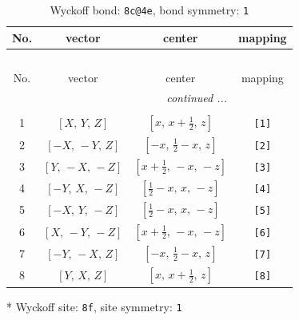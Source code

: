 \documentclass[fleqn,8pt]{jsarticle}
\begin{document}
\renewcommand{\arraystretch}{1.2}
\begin{longtable}{cccc}
\caption{Wyckoff bond: {\tt 8c@4e}, bond symmetry: {\tt 1}}
 \\
 \hline \hline
No. & vector & center & mapping \\ \hline \endfirsthead

\multicolumn{3}{l}{\tablename\ \thetable{}} \\
 \hline \hline
No. & vector & center & mapping \\ \hline \endhead

 \hline \hline
\multicolumn{3}{r}{\footnotesize\it continued ...} \\ \endfoot

 \hline \hline
\multicolumn{3}{r}{} \\ \endlastfoot

1 & $\left[ X,\, Y,\, Z \right]$ & $\left[ x,\, x + \frac{1}{2},\, z \right]$ & {\tt [1]} \\ \hline
2 & $\left[ - X,\, - Y,\, Z \right]$ & $\left[ - x,\, \frac{1}{2} - x,\, z \right]$ & {\tt [2]} \\ \hline
3 & $\left[ Y,\, - X,\, - Z \right]$ & $\left[ x + \frac{1}{2},\, - x,\, - z \right]$ & {\tt [3]} \\ \hline
4 & $\left[ - Y,\, X,\, - Z \right]$ & $\left[ \frac{1}{2} - x,\, x,\, - z \right]$ & {\tt [4]} \\ \hline
5 & $\left[ - X,\, Y,\, - Z \right]$ & $\left[ \frac{1}{2} - x,\, x,\, - z \right]$ & {\tt [5]} \\ \hline
6 & $\left[ X,\, - Y,\, - Z \right]$ & $\left[ x + \frac{1}{2},\, - x,\, - z \right]$ & {\tt [6]} \\ \hline
7 & $\left[ - Y,\, - X,\, Z \right]$ & $\left[ - x,\, \frac{1}{2} - x,\, z \right]$ & {\tt [7]} \\ \hline
8 & $\left[ Y,\, X,\, Z \right]$ & $\left[ x,\, x + \frac{1}{2},\, z \right]$ & {\tt [8]} \\
\end{longtable}
* Wyckoff site: {\tt 8f}, site symmetry: {\tt 1}
\renewcommand{\arraystretch}{1.2}
\end{document}
